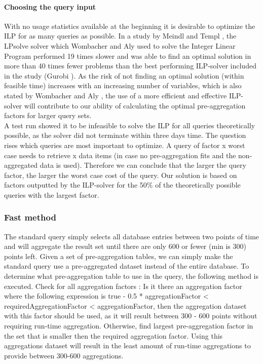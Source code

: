 \paragraph{Choosing the query input}
With no usage statistics available at the beginning it is desirable to optimize the ILP for as many queries as possible. In a study by Meindl and Templ \cite{meindl2012}, the LPsolve solver which Wombacher and Aly \cite{wombacher2011} used to solve the Integer Linear Program performed 19 times slower and was able to find an optimal solution in more than 40 times fewer problems than the best performing ILP-solver included in the study (Gurobi \cite{gurobi}). As the risk of not finding an optimal solution (within feasible time) increases with an increasing number of variables, which is also stated by Wombacher and Aly \cite{wombacher2011}, the use of a more efficient and effective ILP-solver will contribute to our ability of calculating the optimal pre-aggregation factors for larger query sets.\\

A test run showed it to be infeasible to solve the ILP for all queries theoretically possible, as the solver did not terminate within three days time. The question rises which queries are most important to optimize. A query of factor x worst case needs to retrieve x data items (in case no pre-aggregation fits and the non-aggregated data is used). Therefore we can conclude that the larger the query factor, the larger the worst case cost of the query. Our solution is based on factors outputted by the ILP-solver for the 50\% of the theoretically possible queries with the largest factor. 

\subsubsection{Fast method}
The standard query simply selects all database entries between two points of time and will aggregate the result set until there are only 600 or fewer (min is 300) points left. Given a set of pre-aggregation tables, we can simply make the standard query use a pre-aggregated dataset instead of the entire database. To determine what pre-aggregation table to use in the query, the following method is executed. Check for all aggregation factors : Is it there an aggregation factor where the following expression is true - 0.5 * aggregationFactor < requiredAggregationFactor < aggregationFactor, then the aggregation dataset with this factor should be used, as it will result between 300 - 600 points without requiring run-time aggregation. Otherwise, find largest pre-aggregation factor in the set that is smaller then the required aggregation factor. Using this aggregations dataset will result in the least amount of run-time aggregations to provide between 300-600 aggregations.

